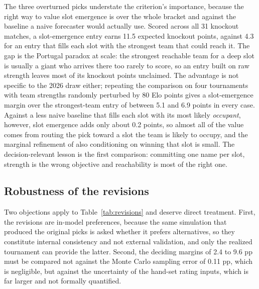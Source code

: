 \documentclass[11pt,letterpaper]{article}
\begin{document}
The three overturned picks understate the criterion's importance, because the right way to value slot emergence is over the whole bracket and against the baseline a naive forecaster would actually use. Scored across all 31 knockout matches, a slot-emergence entry earns 11.5 expected knockout points, against 4.3 for an entry that fills each slot with the strongest team that could reach it. The gap is the Portugal paradox at scale: the strongest reachable team for a deep slot is usually a giant who arrives there too rarely to score, so an entry built on raw strength leaves most of its knockout points unclaimed. The advantage is not specific to the 2026 draw either; repeating the comparison on four tournaments with team strengths randomly perturbed by 80 Elo points gives a slot-emergence margin over the strongest-team entry of between 5.1 and 6.9 points in every case. Against a less naive baseline that fills each slot with its most likely \emph{occupant}, however, slot emergence adds only about 0.2 points, so almost all of the value comes from routing the pick toward a slot the team is likely to occupy, and the marginal refinement of also conditioning on winning that slot is small. The decision-relevant lesson is the first comparison: committing one name per slot, strength is the wrong objective and reachability is most of the right one.

\subsection{Robustness of the revisions}\label{sec:robust}

Two objections apply to Table~\ref{tab:revisions} and deserve direct treatment. First, the revisions are in-model preferences, because the same simulation that produced the original picks is asked whether it prefers alternatives, so they constitute internal consistency and not external validation, and only the realized tournament can provide the latter. Second, the deciding margins of 2.4 to 9.6 pp must be compared not against the Monte Carlo sampling error of 0.11 pp, which is negligible, but against the uncertainty of the hand-set rating inputs, which is far larger and not formally quantified.
\end{document}

